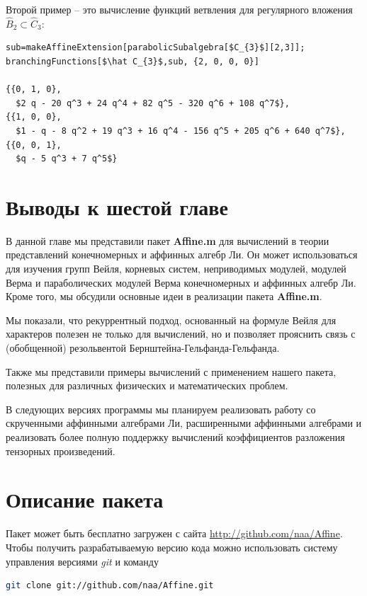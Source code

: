 Второй пример -- это вычисление функций ветвления для регулярного вложения  $\hat B_{2}\subset \hat C_{3}$:
\begin{lstlisting}[mathescape=true]
sub=makeAffineExtension[parabolicSubalgebra[$C_{3}$][2,3]];
branchingFunctions[$\hat C_{3}$,sub, {2, 0, 0, 0}]

{{0, 1, 0}, 
  $2 q - 20 q^3 + 24 q^4 + 82 q^5 - 320 q^6 + 108 q^7$}, 
{{1, 0, 0}, 
  $1 - q - 8 q^2 + 19 q^3 + 16 q^4 - 156 q^5 + 205 q^6 + 640 q^7$}, 
{{0, 0, 1}, 
  $q - 5 q^3 + 7 q^5$}
\end{lstlisting}

\section*{Выводы к шестой главе}
\label{sec:6-conclusion}
В данной главе мы представили пакет {\bf Affine.m} для вычислений в теории представлений конечномерных и аффинных алгебр Ли. Он может использоваться для изучения групп Вейля, корневых систем, неприводимых модулей, модулей Верма и параболических модулей Верма конечномерных и аффинных алгебр Ли. Кроме того, мы обсудили основные идеи в реализации пакета  {\bf Affine.m}. 

Мы показали, что рекуррентный подход, основанный на формуле Вейля для характеров полезен не только для вычислений, но и позволяет прояснить связь с (обобщенной) резольвентой Бернштейна-Гельфанда-Гельфанда.

Также мы представили примеры вычислений с применением нашего пакета, полезных для различных физических и математических проблем. 

В следующих версиях программы мы планируем реализовать работу со скрученными аффинными алгебрами Ли, расширенными аффинными алгебрами и реализовать более полную поддержку вычислений коэффициентов разложения тензорных произведений.

\appendix

\section*{Описание пакета}
\label{package}
Пакет может быть бесплатно загружен с сайта \url{http://github.com/naa/Affine}. Чтобы получить разрабатываемую версию кода можно использовать систему управления версиями {\it git} и команду
\begin{lstlisting}[language=bash]
 git clone git://github.com/naa/Affine.git
\end{lstlisting}


